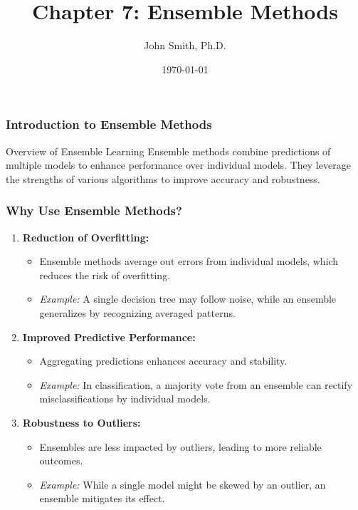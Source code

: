 \documentclass[aspectratio=169]{beamer}
\title[Ensemble Methods]{Chapter 7: Ensemble Methods}
\subtitle{}
\author[J. Smith]{John Smith, Ph.D.}
\institute[University Name]{
  Department of Computer Science\\
  University Name\\
  \vspace{0.3cm}
  Email: email@university.edu\\
  Website: www.university.edu
}
\date{\today}
\begin{document}
\frame{\titlepage}

\begin{frame}[fragile]
    \frametitle{Introduction to Ensemble Methods}
    \begin{block}{Overview of Ensemble Learning}
        Ensemble methods combine predictions of multiple models to enhance performance over individual models. They leverage the strengths of various algorithms to improve accuracy and robustness.
    \end{block}
\end{frame}

\begin{frame}[fragile]
    \frametitle{Why Use Ensemble Methods?}
    \begin{enumerate}
        \item \textbf{Reduction of Overfitting:}
            \begin{itemize}
                \item Ensemble methods average out errors from individual models, which reduces the risk of overfitting.
                \item \textit{Example:} A single decision tree may follow noise, while an ensemble generalizes by recognizing averaged patterns.
            \end{itemize}
        \item \textbf{Improved Predictive Performance:}
            \begin{itemize}
                \item Aggregating predictions enhances accuracy and stability.
                \item \textit{Example:} In classification, a majority vote from an ensemble can rectify misclassifications by individual models.
            \end{itemize}
        \item \textbf{Robustness to Outliers:}
            \begin{itemize}
                \item Ensembles are less impacted by outliers, leading to more reliable outcomes.
                \item \textit{Example:} While a single model might be skewed by an outlier, an ensemble mitigates its effect.
            \end{itemize}
    \end{enumerate}
\end{frame}
\end{document}
